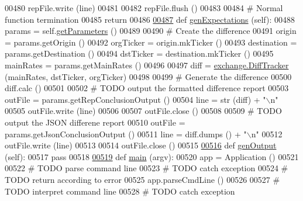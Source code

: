 \begin{DoxyCode}
{00480         repFile.write (line)
00481         
00482         repFile.flush ()
00483     
00484         \textcolor{comment}{# Normal function termination }
00485         \textcolor{keywordflow}{return} 
00486     
\hyperlink{classe2e_1_1_application_a72b854da6d69dbcb5031f24dccf9cc71}{00487}     \textcolor{keyword}{def }\hyperlink{classe2e_1_1_application_a72b854da6d69dbcb5031f24dccf9cc71}{genExpectations} (self):
00488         params = self.\hyperlink{classe2e_1_1_application_ae7bc7b58f19d681635cfa8ae06d9769b}{getParameters} ()
00489 
00490         \textcolor{comment}{# Create the difference}
00491         origin      = params.getOrigin ()
00492         orgTicker   = origin.mkTicker ()
00493         destination = params.getDestination ()
00494         dstTicker   = destination.mkTicker ()
00495         mainRates   = params.getMainRates ()
00496         
00497         diff = \hyperlink{classexchange_1_1_diff_tracker}{exchange.DiffTracker} (mainRates, dstTicker, orgTicker)
00498        
00499         \textcolor{comment}{# Generate the difference}
00500         diff.calc ()
00501         
00502         \textcolor{comment}{# TODO output the formatted difference report}
00503         outFile = params.getRepConclusionOutput ()
00504         line = str (diff) + \textcolor{stringliteral}{"\(\backslash\)n"}
00505         outFile.write (line)
00506         
00507         outFile.close ()
00508         
00509         \textcolor{comment}{# TODO output the JSON differene report}
00510         outFile = params.getJsonConclusionOutput ()
00511         line = diff.dumps () + \textcolor{stringliteral}{"\(\backslash\)n"}
00512         outFile.write (line)
00513         
00514         outFile.close ()
00515             
\hyperlink{classe2e_1_1_application_a0f753699fabab3ae17407b36404d3b64}{00516}     \textcolor{keyword}{def }\hyperlink{classe2e_1_1_application_a0f753699fabab3ae17407b36404d3b64}{genOutput} (self):
00517         \textcolor{keywordflow}{pass}
00518 
\hyperlink{namespacee2e_afb3e7d384688a07b72e1df5201192375}{00519} \textcolor{keyword}{def }\hyperlink{namespacee2e_afb3e7d384688a07b72e1df5201192375}{main} (argv):
00520     app = Application ()
00521     
00522     \textcolor{comment}{# TODO parse command line }
00523     \textcolor{comment}{# TODO catch exception}
00524     \textcolor{comment}{# TODO return according to error}
00525     app.parseCmdLine ()
00526     
00527     \textcolor{comment}{# TODO interpret command line }
00528     \textcolor{comment}{# TODO catch exception}
}
\end{DoxyCode}
